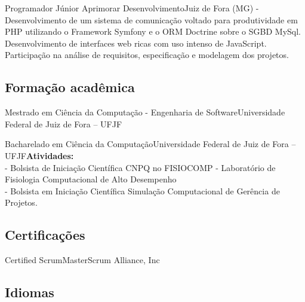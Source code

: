 \documentclass[12pt, a4paper, sans]{moderncv}
\begin{document}
{Programador Júnior}
{Aprimorar Desenvolvimento}{Juiz de Fora (MG)}{}
{- Desenvolvimento de um sistema de comunicação voltado para produtividade em PHP utilizando o Framework Symfony e o ORM Doctrine sobre o SGBD MySql. Desenvolvimento de interfaces web ricas com uso intenso de JavaScript. Participação na análise de requisitos, especificação e modelagem dos projetos.\newline{}
}


%
%
\subsection{Formação acadêmica}
{Mestrado em Ciência da Computação - Engenharia de Software}{Universidade Federal de Juiz de Fora -- UFJF}{}{}{}

{Bacharelado em Ciência da Computação}{Universidade Federal de Juiz de Fora -- UFJF}{}{}{\textbf{Atividades:} 
\\
- Bolsista de Iniciação Científica CNPQ no FISIOCOMP - Laboratório de Fisiologia Computacional de Alto Desempenho
\\
- Bolsista em Iniciação Científica Simulação Computacional de
Gerência de Projetos.}

\subsection{Certificações}

{Certified ScrumMaster}{Scrum Alliance, Inc}{}{}{}



%
%

\subsection{Idiomas}

%
%

\end{document}
